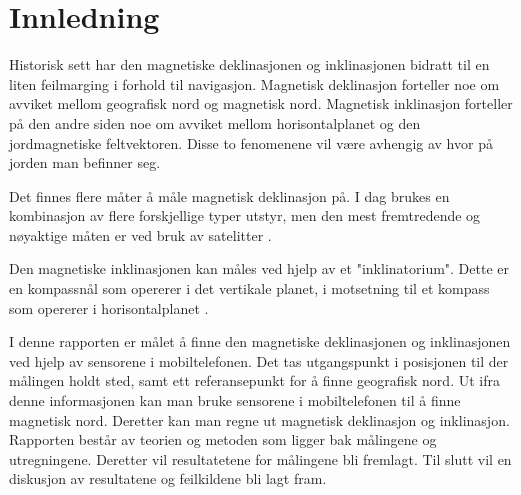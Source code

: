 \section{Innledning}

Historisk sett har den magnetiske deklinasjonen og inklinasjonen bidratt til en liten feilmarging i forhold til navigasjon. Magnetisk deklinasjon forteller noe om avviket mellom geografisk nord og magnetisk nord. Magnetisk inklinasjon forteller på den andre siden noe om avviket mellom horisontalplanet og den jordmagnetiske feltvektoren. Disse to fenomenene vil være avhengig av hvor på jorden man befinner seg.  

Det finnes flere måter å måle magnetisk deklinasjon på. I dag brukes en kombinasjon av flere forskjellige typer utstyr, men den mest fremtredende og nøyaktige måten er ved bruk av satelitter \cite{World_magnetic_model}.     

Den magnetiske inklinasjonen kan måles ved hjelp av et "inklinatorium". Dette er en kompassnål som opererer i det vertikale planet, i motsetning til et kompass som opererer i horisontalplanet \cite{inklinometer}. 

I denne rapporten er målet å finne den magnetiske deklinasjonen og inklinasjonen ved hjelp av sensorene i mobiltelefonen. Det tas utgangspunkt i posisjonen til der målingen holdt sted, samt ett referansepunkt for å finne geografisk nord. Ut ifra denne informasjonen kan man bruke sensorene i mobiltelefonen til å finne magnetisk nord. Deretter kan man regne ut magnetisk deklinasjon og inklinasjon. Rapporten består av teorien og metoden som ligger bak målingene og utregningene. Deretter vil resultatetene for målingene bli fremlagt. Til slutt vil en diskusjon av resultatene og feilkildene bli lagt fram. 
